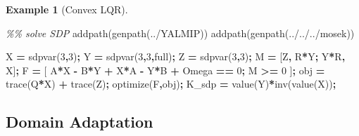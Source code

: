 \documentclass[
]{book}
\newenvironment{Shaded}{\begin{snugshade}}{\end{snugshade}}
\newcommand{\CommentTok}[1]{\textcolor[rgb]{0.56,0.35,0.01}{\textit{#1}}}
\newcommand{\FloatTok}[1]{\textcolor[rgb]{0.00,0.00,0.81}{#1}}
\newcommand{\NormalTok}[1]{#1}
\newcommand{\OperatorTok}[1]{\textcolor[rgb]{0.81,0.36,0.00}{\textbf{#1}}}
\newcommand{\SpecialStringTok}[1]{\textcolor[rgb]{0.31,0.60,0.02}{#1}}
\newcommand{\VariableTok}[1]{\textcolor[rgb]{0.00,0.00,0.00}{#1}}
\theoremstyle{definition}
\theoremstyle{definition}
\newtheorem{example}{Example}[chapter]
\theoremstyle{definition}
\theoremstyle{definition}
\theoremstyle{remark}
\begin{document}
\begin{example}[Convex LQR]
\begin{Shaded}
\begin{Highlighting}[]
\CommentTok{\%\% solve SDP}
\VariableTok{addpath}\NormalTok{(}\VariableTok{genpath}\NormalTok{(}\SpecialStringTok{\textquotesingle{}../YALMIP\textquotesingle{}}\NormalTok{))}
\VariableTok{addpath}\NormalTok{(}\VariableTok{genpath}\NormalTok{(}\SpecialStringTok{\textquotesingle{}../../../mosek\textquotesingle{}}\NormalTok{))}

\VariableTok{X} \OperatorTok{=} \VariableTok{sdpvar}\NormalTok{(}\FloatTok{3}\OperatorTok{,}\FloatTok{3}\NormalTok{)}\OperatorTok{;}
\VariableTok{Y} \OperatorTok{=} \VariableTok{sdpvar}\NormalTok{(}\FloatTok{3}\OperatorTok{,}\FloatTok{3}\OperatorTok{,}\SpecialStringTok{\textquotesingle{}full\textquotesingle{}}\NormalTok{)}\OperatorTok{;}
\VariableTok{Z} \OperatorTok{=} \VariableTok{sdpvar}\NormalTok{(}\FloatTok{3}\OperatorTok{,}\FloatTok{3}\NormalTok{)}\OperatorTok{;}
\VariableTok{M} \OperatorTok{=}\NormalTok{ [}\VariableTok{Z}\OperatorTok{,} \VariableTok{R}\OperatorTok{*}\VariableTok{Y}\OperatorTok{;} \VariableTok{Y}\OperatorTok{\textquotesingle{}*}\VariableTok{R}\OperatorTok{,} \VariableTok{X}\NormalTok{]}\OperatorTok{;}
\VariableTok{F} \OperatorTok{=}\NormalTok{ [}
    \VariableTok{A}\OperatorTok{*}\VariableTok{X} \OperatorTok{{-}} \VariableTok{B}\OperatorTok{*}\VariableTok{Y} \OperatorTok{+} \VariableTok{X}\OperatorTok{*}\VariableTok{A}\OperatorTok{\textquotesingle{}} \OperatorTok{{-}} \VariableTok{Y}\OperatorTok{\textquotesingle{}*}\VariableTok{B}\OperatorTok{\textquotesingle{}} \OperatorTok{+} \VariableTok{Omega} \OperatorTok{==} \FloatTok{0}\OperatorTok{;}
    \VariableTok{M} \OperatorTok{\textgreater{}=} \FloatTok{0}
\NormalTok{]}\OperatorTok{;}
\VariableTok{obj} \OperatorTok{=} \VariableTok{trace}\NormalTok{(}\VariableTok{Q}\OperatorTok{*}\VariableTok{X}\NormalTok{) }\OperatorTok{+} \VariableTok{trace}\NormalTok{(}\VariableTok{Z}\NormalTok{)}\OperatorTok{;}
\VariableTok{optimize}\NormalTok{(}\VariableTok{F}\OperatorTok{,}\VariableTok{obj}\NormalTok{)}\OperatorTok{;}
\VariableTok{K\_sdp} \OperatorTok{=} \VariableTok{value}\NormalTok{(}\VariableTok{Y}\NormalTok{)}\OperatorTok{*}\VariableTok{inv}\NormalTok{(}\VariableTok{value}\NormalTok{(}\VariableTok{X}\NormalTok{))}\OperatorTok{;}
\end{Highlighting}
\end{Shaded}

\end{example}

\hypertarget{domain-adaptation}{%
\subsection{Domain Adaptation}\label{domain-adaptation}}
\end{document}
